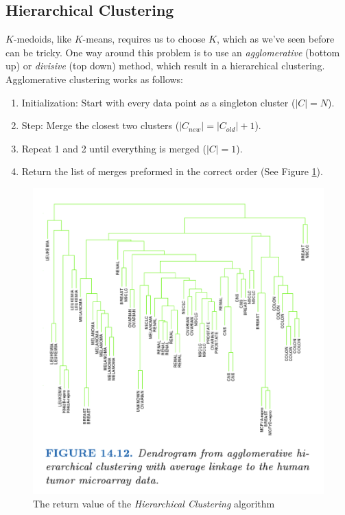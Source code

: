 \documentclass[a4paper]{article}
\begin{document}
\subsection{Hierarchical Clustering}
$K$-medoids, like $K$-means, requires us to choose $K$, which as we've seen before can be tricky.  One way around this problem is to use an \emph{agglomerative} (bottom up) or \emph{divisive} (top down) method, which result in a hierarchical clustering. Agglomerative clustering works as follows:
\begin{enumerate}
\item Initialization: Start with every data point as a singleton cluster ($|C|=N$).
\item Step: Merge the closest two clusters ($|C_{new}| = |C_{old}| + 1$).
\item Repeat 1 and 2 until everything is merged ($|C| = 1$).
\item Return the list of merges preformed in the correct order (See Figure \ref{fig:Hierarchy}).
\end{enumerate}

\begin{figure}
\centering
\includegraphics[width=1.0\textwidth]{HierarchicalClustering.png}
\caption{\label{fig:Hierarchy} The return value of the \textit{Hierarchical Clustering} algorithm}
\end{figure}
\end{document}
